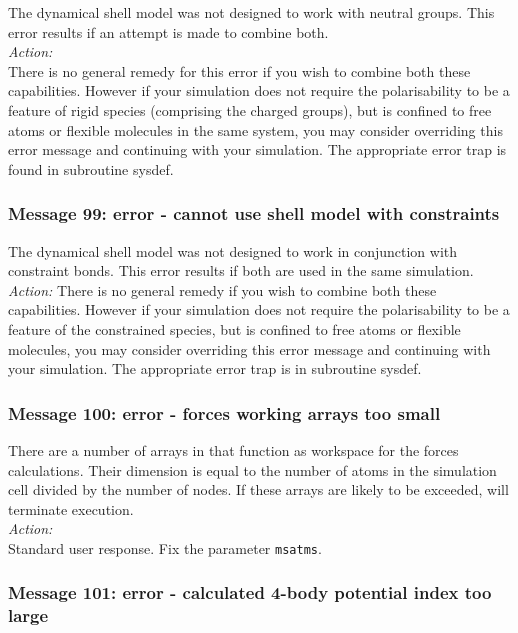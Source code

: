 The dynamical shell model  was not designed to work with neutral
groups. This error results if an attempt is made to combine both. \\

\noindent
{\em Action:} \\
There is no general remedy for this error if you wish to
combine both these capabilities. However if your simulation does not
require the polarisability to be a feature of rigid species
(comprising the charged groups), but
is confined to free atoms or flexible molecules in the same system,
you may consider overriding this error message and continuing with
your simulation. The appropriate error trap is found in subroutine
{\sc sysdef}.

\subsubsection*{Message 99: error - cannot use shell model with
constraints}

The dynamical shell model was not designed to work in conjunction with
constraint bonds. This error results if both are used in the same
simulation. \\

\noindent
{\em Action:}
There is no general remedy if you wish to combine both these
capabilities. However if your simulation does not
require the polarisability to be a feature of the constrained species,
but is confined to free atoms or flexible molecules, you may
consider overriding this error message and continuing with your simulation.
The appropriate error trap is in subroutine {\sc sysdef}.

\subsubsection*{Message 100: error - forces working arrays too small}

There are a number of arrays in \D{} that function as workspace
for the forces calculations. Their dimension is equal to the number of
atoms in the simulation cell divided by the number of nodes. If these
arrays are likely to be exceeded, \D{} will terminate execution. \\ 

\noindent
{\em Action:} \\ 
Standard user response. Fix the parameter {\tt msatms}.

\subsubsection*{Message 101: error - calculated
4-body  potential index too large}

